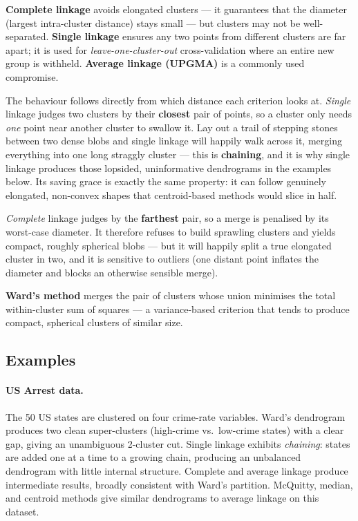\documentclass[11pt, oneside]{book}
\begin{document}
\begin{intbox}[title={Linkage behaviour --- and why single linkage chains}]
\textbf{Complete linkage} avoids elongated clusters — it guarantees that
the diameter (largest intra-cluster distance) stays small — but clusters
may not be well-separated.
\textbf{Single linkage} ensures any two points from different clusters are
far apart; it is used for \emph{leave-one-cluster-out} cross-validation
where an entire new group is withheld.
\textbf{Average linkage (UPGMA)} is a commonly used compromise.

The behaviour follows directly from which distance each criterion looks at.
\emph{Single} linkage judges two clusters by their \textbf{closest} pair of
points, so a cluster only needs \emph{one} point near another cluster to swallow
it.
Lay out a trail of stepping stones between two dense blobs and single linkage will
happily walk across it, merging everything into one long straggly cluster ---
this is \textbf{chaining}, and it is why single linkage produces those lopsided,
uninformative dendrograms in the examples below.
Its saving grace is exactly the same property: it can follow genuinely elongated,
non-convex shapes that centroid-based methods would slice in half.

\emph{Complete} linkage judges by the \textbf{farthest} pair, so a merge is
penalised by its worst-case diameter.
It therefore refuses to build sprawling clusters and yields compact, roughly
spherical blobs --- but it will happily split a true elongated cluster in two, and
it is sensitive to outliers (one distant point inflates the diameter and blocks an
otherwise sensible merge).
\end{intbox}

\textbf{Ward's method} merges the pair of clusters whose union minimises the
total within-cluster sum of squares — a variance-based criterion that tends
to produce compact, spherical clusters of similar size.

\subsection{Examples}

\paragraph{US Arrest data.}
The 50 US states are clustered on four crime-rate variables.
Ward's dendrogram produces two clean super-clusters (high-crime vs.\ low-crime
states) with a clear gap, giving an unambiguous 2-cluster cut.
Single linkage exhibits \emph{chaining}: states are added one at a time to a
growing chain, producing an unbalanced dendrogram with little internal
structure.
Complete and average linkage produce intermediate results, broadly consistent
with Ward's partition.
McQuitty, median, and centroid methods give similar dendrograms to average
linkage on this dataset.
\end{document}
